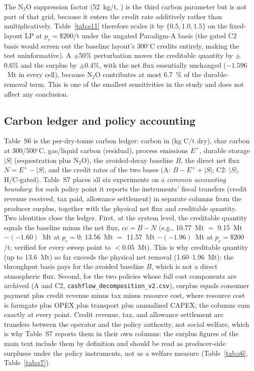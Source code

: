 The N$_2$O suppression factor (52~kg/t, \cite{cayuela2014}) is the third
carbon parameter but is not part of that grid, because it enters the credit
rate additively rather than multiplicatively. Table~\ref{tab:s11} therefore
scales it by $\{0.5,1.0,1.5\}$ on the fixed-layout LP at $p_c=\$200$/t under
the ungated Paradigm-A basis (the gated C2 basis would screen out the
baseline layout's 300$^\circ$C credits entirely, making the test
uninformative). A $\pm$50\% perturbation moves the creditable quantity by
$\pm$0.6\% and the surplus by $\pm$0.4\%, with the net flux essentially
unchanged ($-1.596$~Mt in every cell), because N$_2$O contributes at most
6.7~\% of the durable-removal term. This is one of the smallest sensitivities
in the study and does not affect any conclusion.

\begin{table}[htbp]
\centering
\footnotesize
\setlength{\tabcolsep}{4pt}
\caption{N$_2$O suppression factor sensitivity (review R1-M1) under the
ungated Paradigm-A credit basis, fixed layout, $p_c=\$200$/t.}
\label{tab:s11}

\end{table}

\subsection{Carbon ledger and policy accounting}

Table~S6 is the per-dry-tonne carbon ledger: carbon in (kg C/t dry), char
carbon at 300/500$^\circ$C, gas/liquid carbon (residual), process emissions
$E^{+}$, durable storage $|S|$ (sequestration plus N$_2$O), the avoided-decay
baseline $B$, the direct net flux $N=E^{+}-|S|$, and the credit rates of the
two bases (A: $B-E^{+}+|S|$; C2: $|S|$, H/C-gated). Table~S7 places all six
experiments on a \emph{common accounting boundary}: for each policy point it
reports the instruments' fiscal transfers (credit revenue received, tax paid,
allowance settlement) in separate columns from the producer surplus, together
with the physical net flux and creditable quantity. Two identities close the
ledger. First, at the system level, the creditable quantity equals the baseline
minus the net flux, $\mathrm{cc}=B-N$ (e.g., 10.77~Mt $=$ 9.15~Mt
$- (-1.60)$~Mt at $p_c=0$; 13.56~Mt $=$ 11.57~Mt $- (-1.96)$~Mt at
$p_c=\$200$/t; verified for every sweep point to $<$0.05~Mt). This is why
creditable quantity (up to 13.6~Mt) so far exceeds the physical net removal
(1.60--1.96~Mt): the throughput basis pays for the avoided baseline $B$, which
is not a direct atmospheric flux. Second, for the two policies whose full cost
components are archived (A and C2, \texttt{cashflow\_decomposition\_v2.csv}),
surplus equals consumer payment plus credit revenue minus tax minus resource
cost, where resource cost is farmgate plus OPEX plus transport plus annualized
CAPEX; the columns sum exactly at every point. Credit revenue, tax, and
allowance settlement are transfers between the operator and the policy
authority, not social welfare, which is why Table~S7 reports them in their own
columns: the surplus figures of the main text include them by definition and
should be read as producer-side surpluses under the policy instruments, not as
a welfare measure (Table~\ref{tab:s6}, Table~\ref{tab:s7}).

